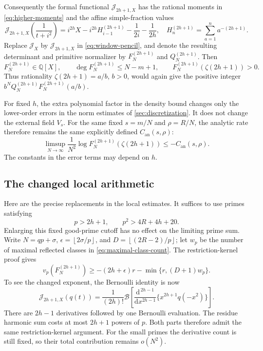 \documentclass[11pt,letterpaper]{article}
\theoremstyle{definition}
\newcommand{\Q}{\mathbb Q}
\newcommand{\J}{\mathcal J}
\newcommand{\Bfun}{\mathcal B}
\newcommand{\an}{\mathrm{an}}
\newcommand{\floor}[1]{\left\lfloor #1\right\rfloor}
\begin{document}
Consequently the formal functional $\J_{2h+1,X}$ has the rational moments
in \eqref{eq:higher-moments} and the affine simple-fraction values
\begin{equation}\label{eq:higher-affine}
 \J_{2h+1,X}\!\left(\frac1{t+i^2}\right)
 =i^{2h}X-i^{2h}H_{i-1}^{(2h+1)}-\frac1{2i}-\frac1{2h},
 \quad H_n^{(2h+1)}=\sum_{a=1}^n a^{-(2h+1)}.
\end{equation}
Replace $\J_X$ by $\J_{2h+1,X}$ in \eqref{eq:window-pencil}, and denote
the resulting determinant and primitive normalizer by $F_N^{(2h+1)}$ and
$Q_N^{(2h+1)}$. Then
\[
 F_N^{(2h+1)}\in\Q[X],\qquad
 \deg F_N^{(2h+1)}\le N-m+1,\qquad
 F_N^{(2h+1)}(\zeta(2h+1))>0.
\]
Thus rationality $\zeta(2h+1)=a/b$, $b>0$, would again give the positive
integer $b^NQ_N^{(2h+1)}F_N^{(2h+1)}(a/b)$.

For fixed $h$, the extra polynomial factor in the density bound changes
only the lower-order errors in the norm estimates of
\cref{sec:discretization}. It does not change the external field $V_s$.
For the same fixed $s=m/N$ and $\rho=R/N$, the analytic rate therefore
remains the same explicitly defined $C_{\an}(s,\rho)$:
\begin{equation}\label{eq:higher-analytic-rate}
 \limsup_{N\to\infty}\frac1{N^2}
   \log F_N^{(2h+1)}(\zeta(2h+1))\le-C_{\an}(s,\rho).
\end{equation}
The constants in the error terms may depend on $h$.

\subsection{The changed local arithmetic}

Here are the precise replacements in the local estimates. It suffices
to use primes satisfying
\[
 p>2h+1,\qquad p^2>4R+4h+20.
\]
Enlarging this fixed good-prime cutoff has no effect on the limiting
prime sum. Write $N=qp+\sigma$, $\epsilon=\floor{2\sigma/p}$, and
$D=\floor{(2R-2)/p}$; let $w_p$ be the number of maximal reflected
classes in \eqref{eq:maximal-class-count}. The restriction-kernel proof
gives
\begin{equation}\label{eq:higher-rank-bound}
 v_p(F_N^{(2h+1)})\ge
 -(2h+\epsilon)r-\min\{r,(D+1)w_p\}.
\end{equation}
To see the changed exponent, the Bernoulli identity is now
\[
 \J_{2h+1,X}(q(t))=
 \frac1{(2h)!}\Bfun\!\left[
 \frac{\mathrm d^{\,2h-1}}{\mathrm d x^{2h-1}}
       \{x^{2h+1}q(-x^2)\}\right].
\]
There are $2h-1$ derivatives followed by one Bernoulli evaluation.
The residue harmonic sum costs at most $2h+1$ powers of $p$.
Both parts therefore admit the same restriction-kernel argument.
For the small primes the derivative count is still fixed, so their
total contribution remains $o(N^2)$.
\end{document}
